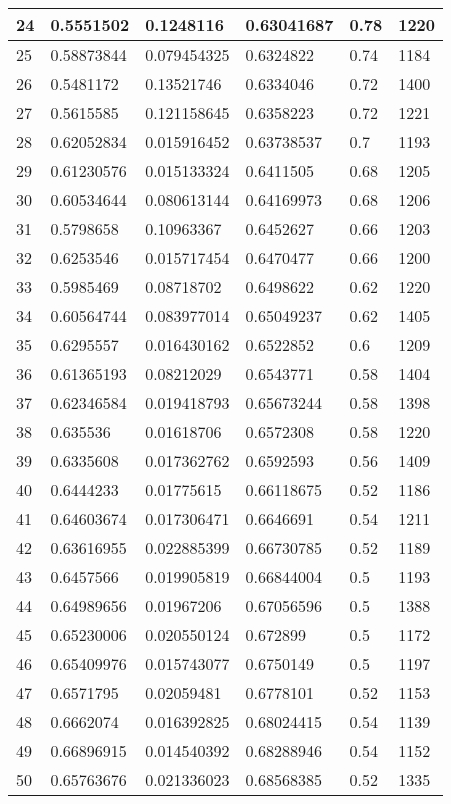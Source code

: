 \begin{longtable}{|l|l|l|l|l|l|}
24 & 0.5551502 & 0.1248116 & 0.63041687 & 0.78 & 1220 \\ \hline 
25 & 0.58873844 & 0.079454325 & 0.6324822 & 0.74 & 1184 \\ \hline 
26 & 0.5481172 & 0.13521746 & 0.6334046 & 0.72 & 1400 \\ \hline 
27 & 0.5615585 & 0.121158645 & 0.6358223 & 0.72 & 1221 \\ \hline 
28 & 0.62052834 & 0.015916452 & 0.63738537 & 0.7 & 1193 \\ \hline 
29 & 0.61230576 & 0.015133324 & 0.6411505 & 0.68 & 1205 \\ \hline 
30 & 0.60534644 & 0.080613144 & 0.64169973 & 0.68 & 1206 \\ \hline 
31 & 0.5798658 & 0.10963367 & 0.6452627 & 0.66 & 1203 \\ \hline 
32 & 0.6253546 & 0.015717454 & 0.6470477 & 0.66 & 1200 \\ \hline 
33 & 0.5985469 & 0.08718702 & 0.6498622 & 0.62 & 1220 \\ \hline 
34 & 0.60564744 & 0.083977014 & 0.65049237 & 0.62 & 1405 \\ \hline 
35 & 0.6295557 & 0.016430162 & 0.6522852 & 0.6 & 1209 \\ \hline 
36 & 0.61365193 & 0.08212029 & 0.6543771 & 0.58 & 1404 \\ \hline 
37 & 0.62346584 & 0.019418793 & 0.65673244 & 0.58 & 1398 \\ \hline 
38 & 0.635536 & 0.01618706 & 0.6572308 & 0.58 & 1220 \\ \hline 
39 & 0.6335608 & 0.017362762 & 0.6592593 & 0.56 & 1409 \\ \hline 
40 & 0.6444233 & 0.01775615 & 0.66118675 & 0.52 & 1186 \\ \hline 
41 & 0.64603674 & 0.017306471 & 0.6646691 & 0.54 & 1211 \\ \hline 
42 & 0.63616955 & 0.022885399 & 0.66730785 & 0.52 & 1189 \\ \hline 
43 & 0.6457566 & 0.019905819 & 0.66844004 & 0.5 & 1193 \\ \hline 
44 & 0.64989656 & 0.01967206 & 0.67056596 & 0.5 & 1388 \\ \hline 
45 & 0.65230006 & 0.020550124 & 0.672899 & 0.5 & 1172 \\ \hline 
46 & 0.65409976 & 0.015743077 & 0.6750149 & 0.5 & 1197 \\ \hline 
47 & 0.6571795 & 0.02059481 & 0.6778101 & 0.52 & 1153 \\ \hline 
48 & 0.6662074 & 0.016392825 & 0.68024415 & 0.54 & 1139 \\ \hline 
49 & 0.66896915 & 0.014540392 & 0.68288946 & 0.54 & 1152 \\ \hline 
50 & 0.65763676 & 0.021336023 & 0.68568385 & 0.52 & 1335 \\ \hline 
\end{longtable}